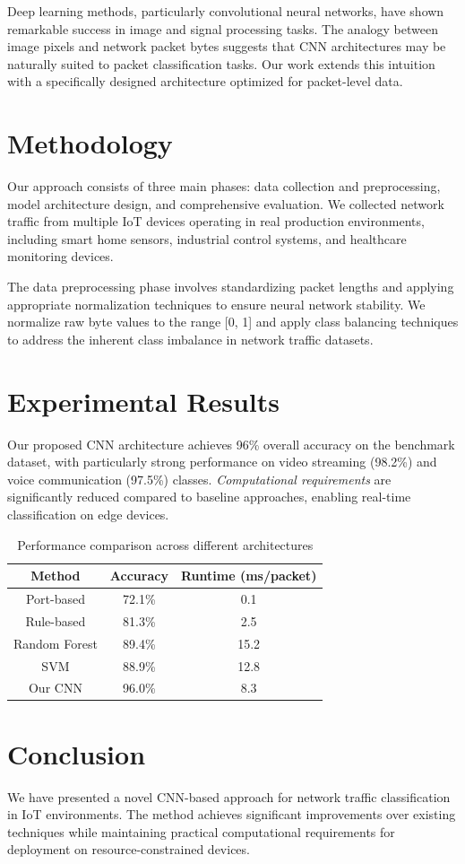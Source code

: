 \documentclass[12pt]{article}
\begin{document}
Deep learning methods, particularly convolutional neural networks, have shown remarkable success in image and signal processing tasks. The analogy between image pixels and network packet bytes suggests that CNN architectures may be naturally suited to packet classification tasks. Our work extends this intuition with a specifically designed architecture optimized for packet-level data.

\section{Methodology}

Our approach consists of three main phases: data collection and preprocessing, model architecture design, and comprehensive evaluation. We collected network traffic from multiple IoT devices operating in real production environments, including smart home sensors, industrial control systems, and healthcare monitoring devices.

The data preprocessing phase involves standardizing packet lengths and applying appropriate normalization techniques to ensure neural network stability. We normalize raw byte values to the range [0, 1] and apply class balancing techniques to address the inherent class imbalance in network traffic datasets.

\section{Experimental Results}

Our proposed CNN architecture achieves 96\% overall accuracy on the benchmark dataset, with particularly strong performance on video streaming (98.2\%) and voice communication (97.5\%) classes. \textit{Computational requirements} are significantly reduced compared to baseline approaches, enabling real-time classification on edge devices.

\begin{table}
\centering
\caption{Performance comparison across different architectures}
\begin{tabular}{|c|c|c|}
\hline
Method & Accuracy & Runtime (ms/packet) \\
\hline
Port-based & 72.1\% & 0.1 \\
Rule-based & 81.3\% & 2.5 \\
Random Forest & 89.4\% & 15.2 \\
SVM & 88.9\% & 12.8 \\
Our CNN & 96.0\% & 8.3 \\
\hline
\end{tabular}
\end{table}

\section{Conclusion}

We have presented a novel CNN-based approach for network traffic classification in IoT environments. The method achieves significant improvements over existing techniques while maintaining practical computational requirements for deployment on resource-constrained devices.

\clearpage
\end{document}
